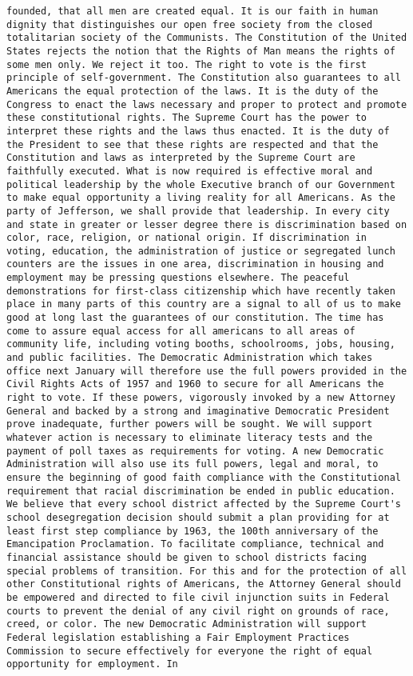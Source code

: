 \documentclass[
]{article}
\begin{document}
\begin{verbatim}
founded, that all men are created equal. It is our faith in human dignity that distinguishes our open free society from the closed totalitarian society of the Communists. The Constitution of the United States rejects the notion that the Rights of Man means the rights of some men only. We reject it too. The right to vote is the first principle of self-government. The Constitution also guarantees to all Americans the equal protection of the laws. It is the duty of the Congress to enact the laws necessary and proper to protect and promote these constitutional rights. The Supreme Court has the power to interpret these rights and the laws thus enacted. It is the duty of the President to see that these rights are respected and that the Constitution and laws as interpreted by the Supreme Court are faithfully executed. What is now required is effective moral and political leadership by the whole Executive branch of our Government to make equal opportunity a living reality for all Americans. As the party of Jefferson, we shall provide that leadership. In every city and state in greater or lesser degree there is discrimination based on color, race, religion, or national origin. If discrimination in voting, education, the administration of justice or segregated lunch counters are the issues in one area, discrimination in housing and employment may be pressing questions elsewhere. The peaceful demonstrations for first-class citizenship which have recently taken place in many parts of this country are a signal to all of us to make good at long last the guarantees of our constitution. The time has come to assure equal access for all americans to all areas of community life, including voting booths, schoolrooms, jobs, housing, and public facilities. The Democratic Administration which takes office next January will therefore use the full powers provided in the Civil Rights Acts of 1957 and 1960 to secure for all Americans the right to vote. If these powers, vigorously invoked by a new Attorney General and backed by a strong and imaginative Democratic President prove inadequate, further powers will be sought. We will support whatever action is necessary to eliminate literacy tests and the payment of poll taxes as requirements for voting. A new Democratic Administration will also use its full powers, legal and moral, to ensure the beginning of good faith compliance with the Constitutional requirement that racial discrimination be ended in public education. We believe that every school district affected by the Supreme Court's school desegregation decision should submit a plan providing for at least first step compliance by 1963, the 100th anniversary of the Emancipation Proclamation. To facilitate compliance, technical and financial assistance should be given to school districts facing special problems of transition. For this and for the protection of all other Constitutional rights of Americans, the Attorney General should be empowered and directed to file civil injunction suits in Federal courts to prevent the denial of any civil right on grounds of race, creed, or color. The new Democratic Administration will support Federal legislation establishing a Fair Employment Practices Commission to secure effectively for everyone the right of equal opportunity for employment. In 
\end{verbatim}
\end{document}
